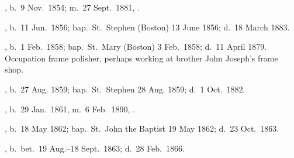 \begin{Kids}
	, b.\ 9 Nov.\ 1854; m.\ 27 Sept.\ 1881, .
	
	, b.\ 11 Jun.\ 1856;\cite{Mary3OBrienBirth} bap.\ St.\ Stephen (Boston) 13 June 1856;\cite{Mary3OBrienBaptism} d.\ 18 March 1883.\cite{Mary3OBrienDeath}
	
	, b.\ 1 Feb.\ 1858;\cite{James3OBrienBirth} bap.\ St.\ Mary (Boston) 3 Feb.\ 1858;\cite{James3OBrienBaptism} d.\ 11 April 1879. Occupation frame polisher,\cite{James3OBrienDeath} perhaps working at brother John Joseph's frame shop.
	
	, b.\ 27 Aug. 1859;\cite{Ellen3OBrienBaptism} bap.\ St.\ Stephen 28 Aug. 1859;\cite{Ellen3OBrienBaptism} d.\ 1 Oct.\ 1882.\cite{Ellen3OBrienDeath}
	
	, b.\ 29 Jan.\ 1861, m.\ 6 Feb.\ 1890, .
	
	, b.\ 18 May 1862;\cite{Margaret3OBrienBaptism} bap.\ St.\ John the Baptist 19 May 1862;\cite{Margaret3OBrienBaptism} d.\ 23 Oct.\ 1863.\cite{Margaret3OBrienDeath}
	
	, b.\ bet.\ 19 Aug.--18 Sept.\ 1863;\cite{Anna3OBrienDeath} d.\ 28 Feb.\ 1866.\cite{Anna3OBrienDeath}
	
\end{Kids}